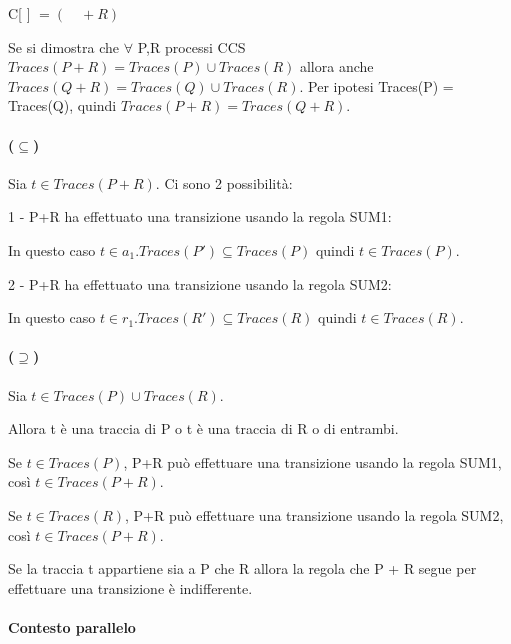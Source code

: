 C[ ] $= ( \quad + R)$

Se si dimostra che $\forall$ P,R processi CCS $Traces(P + R) = Traces(P) \cup Traces(R)$ allora anche $Traces(Q + R) = Traces(Q) \cup Traces(R)$. Per ipotesi Traces(P) = Traces(Q), quindi $Traces(P + R) = Traces(Q + R)$.

\paragraph{($\subseteq$)}

Sia $t \in Traces(P + R)$. Ci sono 2 possibilità:

1 - P+R ha effettuato una transizione usando la regola SUM1:

\begin{prooftree}
\end{prooftree}

In questo caso $t \in a_1.Traces(P') \subseteq Traces(P)$ quindi $t \in Traces(P)$.

2 - P+R ha effettuato una transizione usando la regola SUM2:

\begin{prooftree}
\end{prooftree}

In questo caso $t \in r_1.Traces(R') \subseteq Traces(R)$ quindi $t \in Traces(R)$.

\paragraph{($\supseteq$)}

Sia $t \in Traces(P) \cup Traces(R)$. 

Allora t è una traccia di P o t è una traccia di R o di entrambi. 

Se $t \in Traces(P)$, P+R può effettuare una transizione usando la regola SUM1, così $t \in Traces(P+R)$.

Se $t \in Traces(R)$, P+R può effettuare una transizione usando la regola SUM2, così $t \in Traces(P+R)$.

Se la traccia t appartiene sia a P che R allora la regola che P + R segue per effettuare una transizione è indifferente.

\paragraph{Contesto parallelo}

